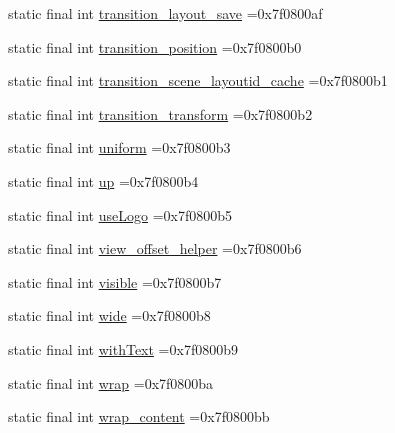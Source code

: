 \begin{DoxyCompactItemize}
\item 
static final int \mbox{\hyperlink{classbr_1_1unb_1_1cic_1_1mp_1_1marketmaster_1_1test_1_1R_1_1id_ab4778e54313d6e06a766d464353a52bc}{transition\+\_\+layout\+\_\+save}} =0x7f0800af
\item 
static final int \mbox{\hyperlink{classbr_1_1unb_1_1cic_1_1mp_1_1marketmaster_1_1test_1_1R_1_1id_a038fc055f9d0ac542da8a600f31f0a60}{transition\+\_\+position}} =0x7f0800b0
\item 
static final int \mbox{\hyperlink{classbr_1_1unb_1_1cic_1_1mp_1_1marketmaster_1_1test_1_1R_1_1id_a13f48984ec8429e17802a0eccf2f4851}{transition\+\_\+scene\+\_\+layoutid\+\_\+cache}} =0x7f0800b1
\item 
static final int \mbox{\hyperlink{classbr_1_1unb_1_1cic_1_1mp_1_1marketmaster_1_1test_1_1R_1_1id_a376302a684918ff578a87f86d2b7e625}{transition\+\_\+transform}} =0x7f0800b2
\item 
static final int \mbox{\hyperlink{classbr_1_1unb_1_1cic_1_1mp_1_1marketmaster_1_1test_1_1R_1_1id_ab2f15f7a59db4feaab237def1765500d}{uniform}} =0x7f0800b3
\item 
static final int \mbox{\hyperlink{classbr_1_1unb_1_1cic_1_1mp_1_1marketmaster_1_1test_1_1R_1_1id_afdd3ff092fc8803a765d8dfd540e7ce5}{up}} =0x7f0800b4
\item 
static final int \mbox{\hyperlink{classbr_1_1unb_1_1cic_1_1mp_1_1marketmaster_1_1test_1_1R_1_1id_a9be549c7152be26077ad50625e7ce233}{use\+Logo}} =0x7f0800b5
\item 
static final int \mbox{\hyperlink{classbr_1_1unb_1_1cic_1_1mp_1_1marketmaster_1_1test_1_1R_1_1id_af16657b594f3c0e744396ff5cf268864}{view\+\_\+offset\+\_\+helper}} =0x7f0800b6
\item 
static final int \mbox{\hyperlink{classbr_1_1unb_1_1cic_1_1mp_1_1marketmaster_1_1test_1_1R_1_1id_ad5eec8f94162f52eb6747b8d2cab31cd}{visible}} =0x7f0800b7
\item 
static final int \mbox{\hyperlink{classbr_1_1unb_1_1cic_1_1mp_1_1marketmaster_1_1test_1_1R_1_1id_a4f7891130f3f45b6721a8c8199bfdaf6}{wide}} =0x7f0800b8
\item 
static final int \mbox{\hyperlink{classbr_1_1unb_1_1cic_1_1mp_1_1marketmaster_1_1test_1_1R_1_1id_ade5f249032b19960813df4699e1fba65}{with\+Text}} =0x7f0800b9
\item 
static final int \mbox{\hyperlink{classbr_1_1unb_1_1cic_1_1mp_1_1marketmaster_1_1test_1_1R_1_1id_a23946956754f273cd004b4517dbc3172}{wrap}} =0x7f0800ba
\item 
static final int \mbox{\hyperlink{classbr_1_1unb_1_1cic_1_1mp_1_1marketmaster_1_1test_1_1R_1_1id_a2b3f3637fdc1810a324c9ca272dd56bc}{wrap\+\_\+content}} =0x7f0800bb
\end{DoxyCompactItemize}


